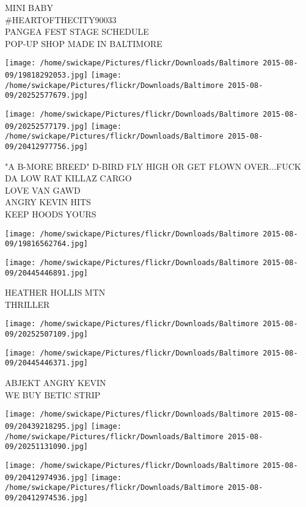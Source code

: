 \documentclass[10pt,letterpaper]{article}
\begin{document}
MINI BABY\\
\#HEARTOFTHECITY90033\\
PANGEA FEST STAGE SCHEDULE\\
POP{-}UP SHOP MADE IN BALTIMORE
\pagebreak

\texttt{[image: /home/swickape/Pictures/flickr/Downloads/Baltimore 2015-08-09/19818292053.jpg]}
\texttt{[image: /home/swickape/Pictures/flickr/Downloads/Baltimore 2015-08-09/20252577679.jpg]}

\texttt{[image: /home/swickape/Pictures/flickr/Downloads/Baltimore 2015-08-09/20252577179.jpg]}
\texttt{[image: /home/swickape/Pictures/flickr/Downloads/Baltimore 2015-08-09/20412977756.jpg]}

"A B{-}MORE BREED" D{-}BIRD FLY HIGH OR GET FLOWN OVER...FUCK DA LOW RAT KILLAZ CARGO\\
LOVE VAN GAWD\\
ANGRY KEVIN HITS\\
KEEP HOODS YOURS
\pagebreak

\texttt{[image: /home/swickape/Pictures/flickr/Downloads/Baltimore 2015-08-09/19816562764.jpg]}

\vspace{0.25in}
\texttt{[image: /home/swickape/Pictures/flickr/Downloads/Baltimore 2015-08-09/20445446891.jpg]}

HEATHER HOLLIS MTN\\
THRILLER
\pagebreak

\texttt{[image: /home/swickape/Pictures/flickr/Downloads/Baltimore 2015-08-09/20252507109.jpg]}

\vspace{0.25in}
\texttt{[image: /home/swickape/Pictures/flickr/Downloads/Baltimore 2015-08-09/20445446371.jpg]}

ABJEKT ANGRY KEVIN\\
WE BUY BETIC STRIP
\pagebreak

\texttt{[image: /home/swickape/Pictures/flickr/Downloads/Baltimore 2015-08-09/20439218295.jpg]}
\texttt{[image: /home/swickape/Pictures/flickr/Downloads/Baltimore 2015-08-09/20251131090.jpg]}

\texttt{[image: /home/swickape/Pictures/flickr/Downloads/Baltimore 2015-08-09/20412974936.jpg]}
\texttt{[image: /home/swickape/Pictures/flickr/Downloads/Baltimore 2015-08-09/20412974536.jpg]}
\end{document}
